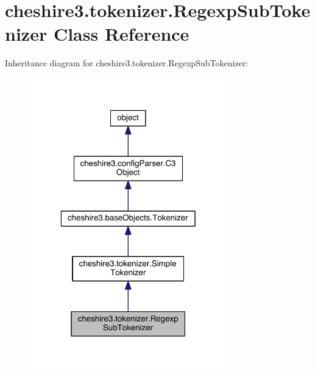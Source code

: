 \hypertarget{classcheshire3_1_1tokenizer_1_1_regexp_sub_tokenizer}{\section{cheshire3.\-tokenizer.\-Regexp\-Sub\-Tokenizer Class Reference}
\label{classcheshire3_1_1tokenizer_1_1_regexp_sub_tokenizer}
}


Inheritance diagram for cheshire3.\-tokenizer.\-Regexp\-Sub\-Tokenizer\-:
\nopagebreak
\begin{figure}[H]
\begin{center}
\leavevmode
\includegraphics[width=244pt]{classcheshire3_1_1tokenizer_1_1_regexp_sub_tokenizer__inherit__graph}
\end{center}
\end{figure}


